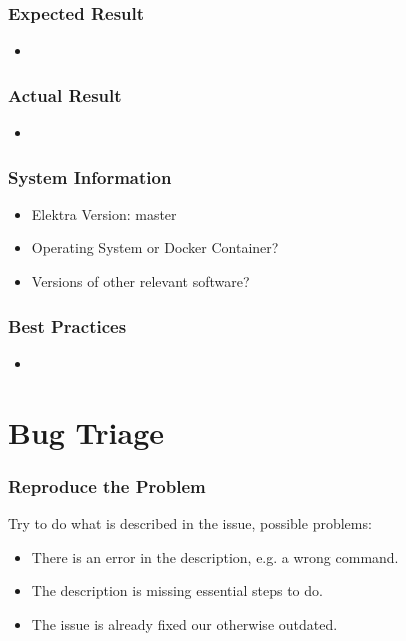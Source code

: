 \begin{frame}
	\frametitle{Expected Result}
	\begin{itemize}
		\item 
	\end{itemize}
\end{frame}

\begin{frame}
	\frametitle{Actual Result}
	\begin{itemize}
		\item 
	\end{itemize}
\end{frame}

\begin{frame}
	\frametitle{System Information}
	\begin{itemize}
		\item Elektra Version: master
		\item Operating System or Docker Container?
		\item Versions of other relevant software?
	\end{itemize}
\end{frame}

\begin{frame}
	\frametitle{Best Practices}
	\begin{itemize}
		\item 
	\end{itemize}
\end{frame}

\section{Bug Triage}

\begin{frame}
	\frametitle{Reproduce the Problem}
	Try to do what is described in the issue, possible problems:
	\begin{itemize}
		\item There is an error in the description, e.g. a wrong command.
		\item The description is missing essential steps to do.
		\item The issue is already fixed our otherwise outdated.
	\end{itemize}
\end{frame}

